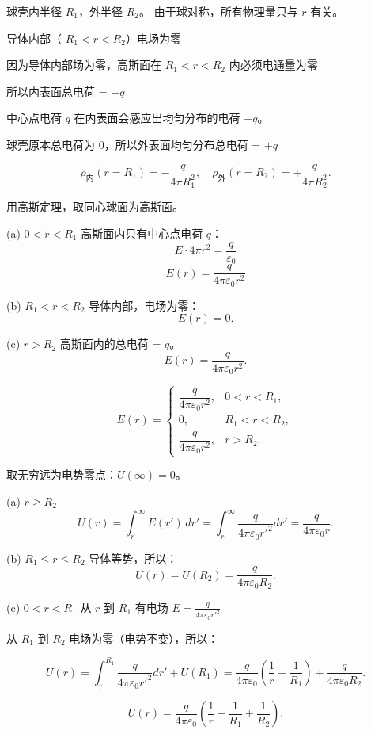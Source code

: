 \documentclass{article}
\begin{document}
球壳内半径 $ R_1 $，外半径 $ R_2 $。
由于球对称，所有物理量只与 $ r $ 有关。


导体内部（ $ R_1 < r < R_2 $）电场为零

因为导体内部场为零，高斯面在 $ R_1 < r < R_2 $ 内必须电通量为零

所以内表面总电荷 = $-q$

中心点电荷 $ q $ 在内表面会感应出均匀分布的电荷 $ -q $。  

球壳原本总电荷为 0，所以外表面均匀分布总电荷 = $ +q $

$$\rho_{\text{内}}(r=R_1) = -\frac{q}{4\pi R_1^2}, \quad\rho_{\text{外}}(r=R_2) = +\frac{q}{4\pi R_2^2}.$$



用高斯定理，取同心球面为高斯面。

(a) $ 0 < r < R_1 $
高斯面内只有中心点电荷 $ q $：
$$E \cdot 4\pi r^2 = \frac{q}{\varepsilon_0}$$
$$E(r) = \frac{q}{4\pi\varepsilon_0 r^2}$$


(b) $ R_1 < r < R_2 $
导体内部，电场为零：
$$E(r) = 0.$$

(c) $ r > R_2 $
高斯面内的总电荷 =  $ q $。
$$E(r) = \frac{q}{4\pi\varepsilon_0 r^2}.$$



$$
E(r) =
\begin{cases}
\dfrac{q}{4\pi\varepsilon_0 r^2}, & 0 < r < R_1, \\
0, & R_1 < r < R_2, \\
\dfrac{q}{4\pi\varepsilon_0 r^2}, & r > R_2.
\end{cases}
$$



取无穷远为电势零点：$ U(\infty) = 0 $。

(a) $ r \ge R_2 $
$$
U(r) = \int_{r}^{\infty} E(r') \, dr'
= \int_{r}^{\infty} \frac{q}{4\pi\varepsilon_0 r'^2} dr'
= \frac{q}{4\pi\varepsilon_0 r}.
$$

(b) $ R_1 \le r \le R_2 $
导体等势，所以：
$$
U(r) = U(R_2) = \frac{q}{4\pi\varepsilon_0 R_2}.
$$

(c) $ 0 < r < R_1 $
从 $ r $ 到 $ R_1 $ 有电场 $ E = \frac{q}{4\pi\varepsilon_0 r'^2} $

从 $ R_1 $ 到 $ R_2 $ 电场为零（电势不变），所以：

$$
U(r) = \int_{r}^{R_1} \frac{q}{4\pi\varepsilon_0 r'^2} dr' + U(R_1)= \frac{q}{4\pi\varepsilon_0} \left( \frac{1}{r} - \frac{1}{R_1} \right) + \frac{q}{4\pi\varepsilon_0 R_2}.
$$

$$
U(r) = \frac{q}{4\pi\varepsilon_0} \left( \frac{1}{r} - \frac{1}{R_1} + \frac{1}{R_2} \right).
$$
\end{document}
